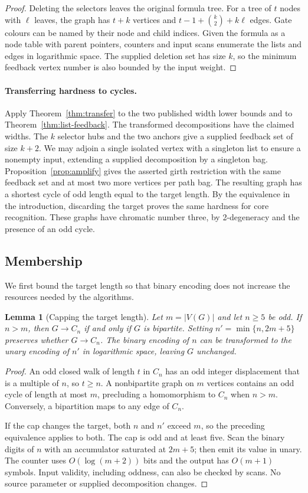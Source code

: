 \documentclass[11pt]{article}
\newtheorem{lemma}[theorem]{Lemma}
\theoremstyle{remark}
\begin{document}
\begin{proof}
Deleting the selectors leaves the original formula tree. For a tree of $t$
nodes with $\ell$ leaves, the graph has $t+k$ vertices and
$t-1+\binom{k}{2}+k\ell$ edges. Gate colours can be named by their node
and child indices. Given the formula as a node table with parent pointers,
counters and input scans enumerate the lists and edges in logarithmic space.
The supplied deletion set has size $k$, so the minimum feedback vertex
number is also bounded by the input weight.
\end{proof}

\paragraph{Transferring hardness to cycles.}
Apply Theorem~\ref{thm:transfer} to the two published width lower bounds
and to Theorem~\ref{thm:list-feedback}. The transformed decompositions
have the claimed widths. The $k$ selector hubs and the two anchors give
a supplied feedback set of size $k+2$.
We may adjoin a single isolated vertex with a singleton list to ensure a
nonempty input, extending a supplied decomposition by a singleton bag.
Proposition~\ref{prop:amplify} gives the asserted girth restriction
with the same feedback set and at most two more vertices per path bag.
The resulting graph has a shortest cycle of odd length equal to the target
length. By the equivalence in the introduction, discarding the target
proves the same hardness for core recognition. These graphs have chromatic
number three, by 2-degeneracy and the presence of an odd cycle.

\subsection{Membership}
We first bound the target length so that binary encoding does not increase
the resources needed by the algorithms.

\begin{lemma}[Capping the target length]\label{lem:cap}
Let $m=|V(G)|$ and let $n\geq5$ be odd. If $n>m$, then $G\to C_n$ if and
only if $G$ is bipartite. Setting $n'=\min\{n,2m+5\}$ preserves whether
$G\to C_n$. The binary encoding of $n$ can be transformed to the unary
encoding of $n'$ in logarithmic space, leaving $G$ unchanged.
\end{lemma}
\begin{proof}
An odd closed walk of length $t$ in $C_n$ has an odd integer displacement
that is a multiple of $n$, so $t\geq n$. A nonbipartite graph on $m$
vertices contains an odd cycle of length at most $m$, precluding a
homomorphism to $C_n$ when $n>m$. Conversely, a bipartition maps to any
edge of $C_n$.

If the cap changes the target, both $n$ and $n'$ exceed $m$, so the
preceding equivalence applies to both. The cap is odd and at least five.
Scan the binary digits of $n$ with an accumulator saturated at $2m+5$;
then emit its value in unary. The counter uses $O(\log(m+2))$ bits and
the output has $O(m+1)$ symbols. Input validity, including oddness, can
also be checked by scans. No source parameter or supplied decomposition
changes.
\end{proof}
\end{document}
